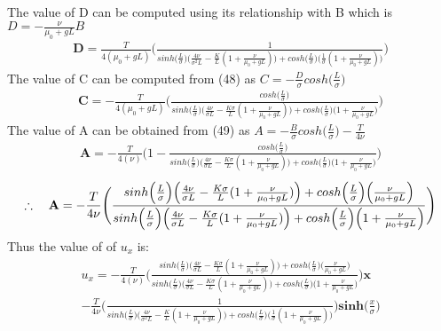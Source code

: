 \documentclass[a4paper,oneside,11pt]{report}
\begin{document}
The value of D can be computed using its relationship with B which is $D = -\frac{\nu}{\mu_0 + gL} B$
\begin{align}
\textbf{D} = \frac{T}{4(\mu_0 + gL)} \Bigg ( \frac{1}{sinh \Big( \frac{L}{\sigma}\Big ) \Big ( \frac{4\nu}{\sigma^2 L} - \frac{K}{L} (1+ \frac{\nu}{\mu_0 + gL}) \Big ) + cosh\Big ( \frac{L}{\sigma} \Big ) \Big (  \frac{1}{\sigma} (1+ \frac{\nu}{\mu_0 + gL}) \Big )} \Bigg)
\end{align}
The value of C can be computed from (48) as $C = -\frac{D}{\sigma}cosh\Big ( \frac{L}{\sigma} \Big )$
\begin{align}
\textbf{C} = -\frac{T}{4(\mu_0 + gL)} \Bigg ( \frac{cosh\Big ( \frac{L}{\sigma} \Big )}{sinh \Big( \frac{L}{\sigma}\Big ) \Big ( \frac{4\nu}{\sigma L} - \frac{K \sigma}{L} (1+ \frac{\nu}{\mu_0 + gL}) \Big ) + cosh\Big ( \frac{L}{\sigma} \Big ) \Big ( 1+ \frac{\nu}{\mu_0 + gL} \Big )} \Bigg)
\end{align}
The value of A can be obtained from (49) as $A = -\frac{B}{\sigma}cosh\Big ( \frac{L}{\sigma} \Big ) -\frac{T}{4\nu}$
\begin{align*}
\textbf{A} = -\frac{T}{4(\nu)} \Bigg ( 1 - \frac{cosh\Big ( \frac{L}{\sigma} \Big )}{sinh \Big( \frac{L}{\sigma}\Big ) \Big ( \frac{4\nu}{\sigma L} - \frac{K \sigma}{L} (1+ \frac{\nu}{\mu_0 + gL}) \Big ) + cosh\Big ( \frac{L}{\sigma} \Big ) \Big ( 1+ \frac{\nu}{\mu_0 + gL} \Big )} \Bigg)
\end{align*}
\begin{align}
\therefore \hspace{0.35cm}
\textbf{A} = -\frac{T}{4\nu} \Bigg ( \frac{sinh \Big( \frac{L}{\sigma}\Big ) \Big ( \frac{4\nu}{\sigma L} - \frac{K \sigma}{L} (1+ \frac{\nu}{\mu_0 + gL}) \Big ) + cosh\Big ( \frac{L}{\sigma} \Big ) \Big ( \frac{\nu}{\mu_0 + gL} \Big )}{sinh \Big( \frac{L}{\sigma}\Big ) \Big ( \frac{4\nu}{\sigma L} - \frac{K \sigma}{L} (1+ \frac{\nu}{\mu_0 + gL}) \Big ) + cosh\Big ( \frac{L}{\sigma} \Big ) \Big ( 1+ \frac{\nu}{\mu_0 + gL} \Big )} \Bigg)
\end{align}
Thus the value of of $u_x$ is: 
\begin{align*}
u_x = -\frac{T}{4(\nu)} \Bigg ( \frac{sinh \Big( \frac{L}{\sigma}\Big ) \Big ( \frac{4\nu}{\sigma L} - \frac{K \sigma}{L} (1+ \frac{\nu}{\mu_0 + gL}) \Big ) + cosh\Big ( \frac{L}{\sigma} \Big ) \Big ( \frac{\nu}{\mu_0 + gL} \Big )}{sinh \Big( \frac{L}{\sigma}\Big ) \Big ( \frac{4\nu}{\sigma L} - \frac{K \sigma}{L} (1+ \frac{\nu}{\mu_0 + gL}) \Big ) + cosh\Big ( \frac{L}{\sigma} \Big ) \Big ( 1+ \frac{\nu}{\mu_0 + gL} \Big )} \Bigg)\textbf{x} \\ -\frac{T}{4\nu} \Bigg ( \frac{1}{sinh \Big( \frac{L}{\sigma}\Big ) \Big ( \frac{4\nu}{\sigma^2 L} - \frac{K}{L} (1+ \frac{\nu}{\mu_0 + gL}) \Big ) + cosh\Big ( \frac{L}{\sigma} \Big ) \Big (  \frac{1}{\sigma} (1+ \frac{\nu}{\mu_0 + gL}) \Big )} \Bigg) \textbf{sinh} \Big ( \frac{x}{\sigma} \Big )\\
\end{align*}
\end{document}
